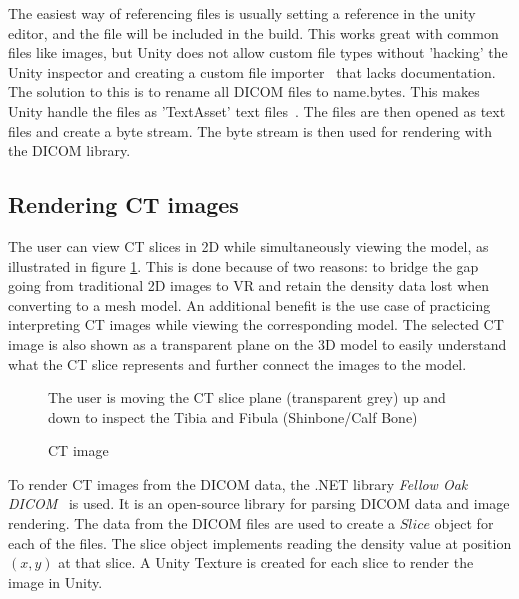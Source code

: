 \documentclass[a4paper]{report}
\begin{document}
The easiest way of referencing files is usually setting a reference in the unity editor, and the file will be included in the build. This works great with common files like images, but Unity does not allow custom file types without 'hacking' the Unity inspector and creating a custom file importer~\cite{scriptedimporters_unity_nodate} that lacks documentation. The solution to this is to rename all DICOM files to {name}.bytes. This makes Unity handle the files as 'TextAsset' text files~\cite{textassets_unity_nodate}. The files are then opened as text files and create a byte stream. The byte stream is then used for rendering with the DICOM library.

\subsection{Rendering CT images}

The user can view CT slices in 2D while simultaneously viewing the model, as illustrated in figure \ref{ctscan}. This is done because of two reasons: to bridge the gap going from traditional 2D images to VR and retain the density data lost when converting to a mesh model.
An additional benefit is the use case of practicing interpreting CT images while viewing the corresponding model. The selected CT image is also shown as a transparent plane on the 3D model to easily understand what the CT slice represents and further connect the images to the model.

\begin{figure}[h!]
    \centering
	\hfill
	\caption{CT image}\label{ctscan}
  \small
 The user is moving the CT slice plane (transparent grey) up and down to inspect the Tibia and Fibula (Shinbone/Calf Bone)
\end{figure}

To render CT images from the DICOM data, the .NET library \emph{Fellow Oak DICOM}~\cite{noauthor_fellow_2022} is used. It is an open-source library for parsing DICOM data and image rendering.
The data from the DICOM files are used to create a $Slice$ object for each of the files. The slice object implements reading the density value at position $(x, y)$ at that slice. A Unity Texture is created for each slice to render the image in Unity.
\end{document}
